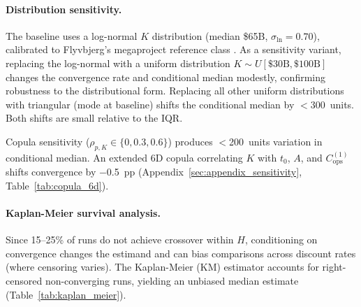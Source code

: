 \documentclass[5p,twocolumn]{elsarticle}
\begin{document}
\paragraph{Distribution sensitivity.} The baseline uses a log-normal $K$ distribution (median \$65B, $\sigma_{\ln} = 0.70$), calibrated to Flyvbjerg's megaproject reference class \cite{flyvbjerg2014}. As a sensitivity variant, replacing the log-normal with a uniform distribution $K \sim U[\$30\text{B}, \$100\text{B}]$ changes the convergence rate and conditional median modestly, confirming robustness to the distributional form. Replacing all other uniform distributions with triangular (mode at baseline) shifts the conditional median by $<$300~units. Both shifts are small relative to the IQR.

Copula sensitivity ($\rho_{p,K} \in \{0, 0.3, 0.6\}$) produces $<$200~units variation in conditional median. An extended 6D copula correlating $K$ with $t_0$, $A$, and $C_{\mathrm{ops}}^{(1)}$ shifts convergence by $-$0.5~pp (Appendix~\ref{sec:appendix_sensitivity}, Table~\ref{tab:copula_6d}).

\paragraph{Kaplan-Meier survival analysis.} Since 15--25\% of runs do not achieve crossover within $H$, conditioning on convergence changes the estimand and can bias comparisons across discount rates (where censoring varies). The Kaplan-Meier (KM) estimator \cite{kaplan1958} accounts for right-censored non-converging runs, yielding an unbiased median estimate (Table~\ref{tab:kaplan_meier}).

\begin{table}[htbp]
\centering
\caption{Kaplan-Meier median vs.\ conditional median (10{,}000 MC runs, $H = 40{,}000$, canonical configuration). The KM estimator accounts for right-censored non-converging observations.}
\label{tab:kaplan_meier}
\small
{}
\end{table}
\end{document}
